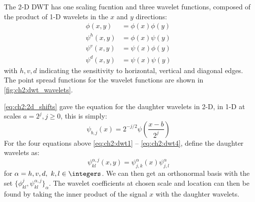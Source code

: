   The 2-D DWT has one scaling fucntion and three wavelet functions, composed of
  the product of 1-D wavelets in the $x$ and $y$ directions:
  \begin{align}
    \phi(x,y) &= \phi(x)\phi(y) \label{eq:ch2:dwt1}\\
    \psi^h(x,y) &= \phi(x) \psi(y) \\
    \psi^v(x,y) & = \psi(x) \phi(y) \\
    \psi^d(x,y) & = \psi(x) \psi(y) \label{eq:ch2:dwt4}
  \end{align}
  with $h, v, d$ indicating the sensitivity to horizontal, vertical and diagonal
  edges. The point spread functions for the wavelet functions are shown in \autoref{fig:ch2:dwt_wavelets}.
  
  \eqref{eq:ch2:2d_shifts} gave the equation for the daughter wavelets in 2-D,
  in 1-D at scales $a=2^j, j \geq 0$, this is simply:
  \begin{equation}
    \psi_{b, j}(x) = 2^{-j/2} \psi\left(\frac{x-b}{2^j} \right)
  \end{equation}
  For the four equations above \eqref{eq:ch2:dwt1} -- \eqref{eq:ch2:dwt4},
  define the daughter wavelets as:
  \begin{equation}
    \psi_{kl}^{\alpha, j}(x,y) = \psi^\alpha_{j,k}(x)\psi^\alpha_{j,l}
  \end{equation}
  for $\alpha = h, v, d,\ k,l \in \integers$. We can then get an orthonormal
  basis with the set $\{ \phi^j_{kl}, \psi^{\alpha,j}_{kl} \}_{\alpha}$.
  The wavelet coefficients at chosen scale and location can then be found by
  taking the inner product of the signal $x$ with the daughter wavelets.


